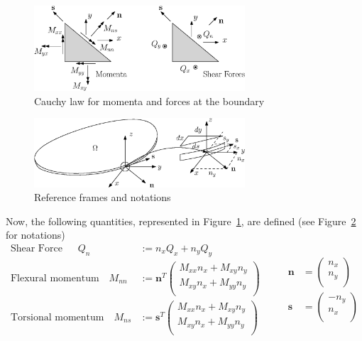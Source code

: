 \documentclass[preprint,12pt]{elsarticle}
\begin{document}
\begin{figure}
	\centering
	\includegraphics[width=0.7\textwidth]{Cauchy_law.eps}
	\caption{Cauchy law for momenta and forces at the boundary}
	\label{fig:Cauchy_law}
\end{figure}

	\begin{figure}[t]
	\centering
	\includegraphics[width=0.7\textwidth]{Plate_ref.eps}
	\caption{Reference frames and notations}
	\label{fig:plate_ref}
\end{figure}

Now, the following quantities, represented in Figure~\ref{fig:Cauchy_law}, are defined (see Figure~\ref{fig:plate_ref} for notations) 
\begin{equation}
\label{eq:QnMnnMns}
\begin{aligned}
\text{Shear Force} \; \; \quad Q_{n} &:= n_x Q_x + n_y Q_y   \\
\text{Flexural momentum} \quad 
M_{nn} &:= \bm{n}^T	
\begin{pmatrix}
M_{xx} n_x + M_{xy} n_y \\
M_{xy} n_x + M_{yy} n_y \\
\end{pmatrix} \\
\text{Torsional momentum} \quad M_{ns} &:= \bm{s}^T	
\begin{pmatrix}
M_{xx} n_x + M_{xy} n_y \\
M_{xy} n_x + M_{yy} n_y \\
\end{pmatrix} 
\end{aligned} \qquad
\begin{aligned}
\bm{n} &= 
\begin{pmatrix}
n_x \\
n_y \\
\end{pmatrix} \\
\bm{s} &= 
\begin{pmatrix}
-n_y \\
n_x \\
\end{pmatrix}
\end{aligned}
\end{equation}
\end{document}
